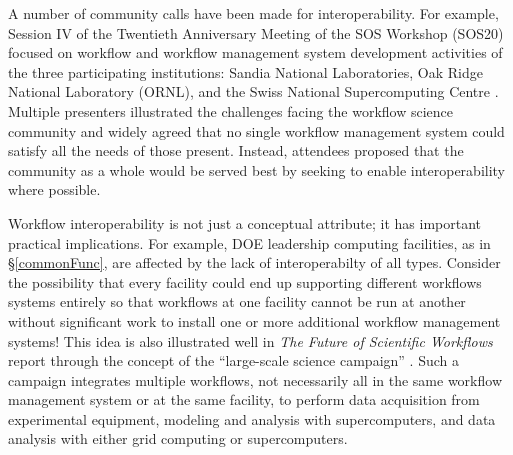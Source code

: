 A number of community calls have been made for interoperability. For example,
Session IV of the Twentieth Anniversary Meeting of the SOS Workshop (SOS20)
focused on workflow and workflow management system development activities of
the three participating institutions: Sandia National Laboratories, Oak Ridge
National Laboratory (ORNL), and the Swiss National Supercomputing Centre
\cite{pack_sos20_2016}. Multiple presenters illustrated the challenges facing
the workflow science community and widely agreed that no single workflow
management system could satisfy all the needs of those present. Instead,
attendees proposed that the community as a whole would be served best by
seeking to enable interoperability where possible.

Workflow interoperability is not just a conceptual attribute; it has
important practical implications. For example, DOE leadership computing
facilities, as in \S\ref{commonFunc}, are affected by the lack of
interoperabilty of all types. Consider the possibility that every facility
could end up supporting different workflows systems entirely so that workflows
at one facility cannot be run at another without significant work to install
one or more additional workflow management systems! This idea is also
illustrated well in \textit{The Future of Scientific Workflows} report through
the concept of the ``large-scale science campaign'' \cite{deelman_future_2015}.
Such a campaign integrates multiple workflows, not necessarily all in the same
workflow management system or at the same facility, to perform data
acquisition from experimental equipment, modeling and analysis with
supercomputers, and data analysis with either grid computing or
supercomputers.